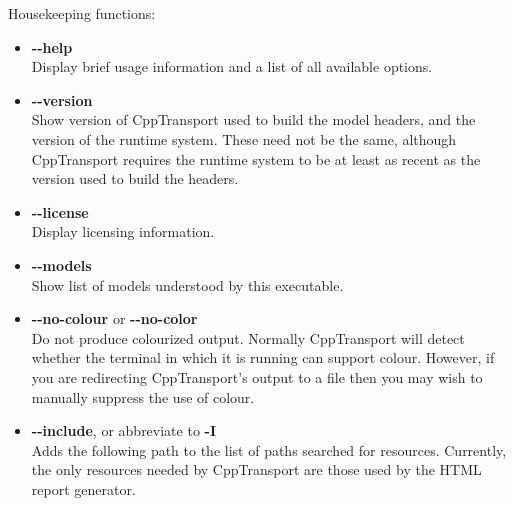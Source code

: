 \documentclass[11pt,a4paper]{article}
\newcommand{\packagefont}{\sffamily}
\newcommand{\CppTransport}{{\packagefont CppTransport}}
\newcommand{\option}[1]{{\ttfamily\bfseries\small #1}}
\begin{document}
\noindent Housekeeping functions:
\begin{itemize}
	\item \option{{-}{-}help} \\
	Display brief usage information and a list of all available options.
	
	\item \option{{-}{-}version} \\
	Show version of {\CppTransport} used to build the model headers,
	and the version of the runtime system. These need not be the same,
	although {\CppTransport} requires the runtime system to be at least as recent
	as the version used to build the headers.
	
	\item \option{{-}{-}license} \\
	Display licensing information.
	
	\item \option{{-}{-}models} \\
	Show list of models understood by this executable.
	
	\item \option{{-}{-}no-colour} or \option{{-}{-}no-color} \\
	Do not produce colourized output.
	Normally {\CppTransport} will detect whether the terminal
	in which it is running can support colour.
	However, if you are redirecting {\CppTransport}'s output to a file
	then you may wish to manually suppress the use of colour.
	
	\item \option{{-}{-}include}, or abbreviate to \option{-I} \\
	Adds the following path to the list of paths searched for resources.
	Currently, the only resources needed by {\CppTransport}
	are those used by the HTML report generator.
\end{itemize}
\end{document}
